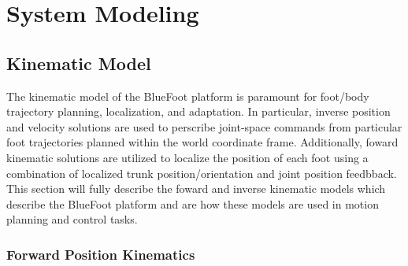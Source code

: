 \chapter{System Modeling}
\label{ch::system_modeling}

	
	\section{Kinematic Model}

		The kinematic model of the BlueFoot platform is paramount for foot/body trajectory planning, localization, and adaptation. In particular, inverse position and velocity solutions are used to perscribe joint-space commands from particular foot trajectories planned within the world coordinate frame. Additionally, foward kinematic solutions are utilized to localize the position of each foot using a combination of localized trunk position/orientation and joint position feedbback. This section will fully describe the foward and inverse kinematic models which describe the BlueFoot platform and are how these models are used in motion planning and control tasks.

		\subsection{Forward Position Kinematics}
		\label{ch::system_modeling_pos_kin}

